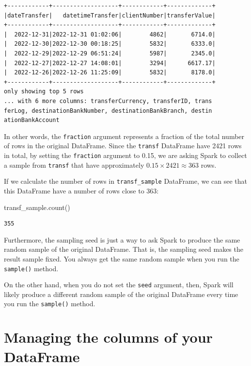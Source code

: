 \documentclass[
  11pt,
  letterpaper,
  DIV=11,
  numbers=noendperiod]{scrreprt}
\newenvironment{Shaded}{\begin{snugshade}}{\end{snugshade}}
\newcommand{\NormalTok}[1]{\textcolor[rgb]{0.00,0.23,0.31}{#1}}
\begin{document}
\begin{verbatim}
+------------+-------------------+------------+-------------+
|dateTransfer|   datetimeTransfer|clientNumber|transferValue|
+------------+-------------------+------------+-------------+
|  2022-12-31|2022-12-31 01:02:06|        4862|       6714.0|
|  2022-12-30|2022-12-30 00:18:25|        5832|       6333.0|
|  2022-12-29|2022-12-29 06:51:24|        5987|       2345.0|
|  2022-12-27|2022-12-27 14:08:01|        3294|      6617.17|
|  2022-12-26|2022-12-26 11:25:09|        5832|       8178.0|
+------------+-------------------+------------+-------------+
only showing top 5 rows
... with 6 more columns: transferCurrency, transferID, trans
ferLog, destinationBankNumber, destinationBankBranch, destin
ationBankAccount
\end{verbatim}

In other words, the \texttt{fraction} argument represents a fraction of
the total number of rows in the original DataFrame. Since the
\texttt{transf} DataFrame have 2421 rows in total, by setting the
\texttt{fraction} argument to 0.15, we are asking Spark to collect a
sample from \texttt{transf} that have approximately
\(0.15 \times 2421 \approx 363\) rows.

If we calculate the number of rows in \texttt{transf\_sample} DataFrame,
we can see that this DataFrame have a number of rows close to 363:

\begin{Shaded}
\begin{Highlighting}[]
\NormalTok{transf\_sample.count()}
\end{Highlighting}
\end{Shaded}

\begin{verbatim}
355
\end{verbatim}

Furthermore, the sampling seed is just a way to ask Spark to produce the
same random sample of the original DataFrame. That is, the sampling seed
makes the result sample fixed. You always get the same random sample
when you run the \texttt{sample()} method.

On the other hand, when you do not set the \texttt{seed} argument, then,
Spark will likely produce a different random sample of the original
DataFrame every time you run the \texttt{sample()} method.

\section{Managing the columns of your
DataFrame}\label{managing-the-columns-of-your-dataframe}
\end{document}
